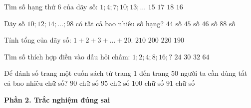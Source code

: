 \begin{ex} %
Tìm số hạng thứ 6 của dãy số: $1; 4; 7; 10; 13; \dots$
\choice
{$15$}
{$17$}
{$18$}
{\True $16$}
\end{ex}

\begin{ex} %
Dãy số $10; 12; 14; \dots; 98$ có tất cả bao nhiêu số hạng?
\choice
{$44$ số}
{\True $45$ số}
{$46$ số}
{$88$ số}
\end{ex}

\begin{ex} %
Tính tổng của dãy số: $1 + 2 + 3 + \dots + 20$.
\choice
{\True $210$}
{$200$}
{$220$}
{$190$}
\end{ex}

\begin{ex} %
Tìm số thích hợp điền vào dấu hỏi chấm: $1; 2; 4; 8; 16; ?$
\choice
{$24$}
{$30$}
{\True $32$}
{$64$}
\end{ex}

\begin{ex} %
Để đánh số trang một cuốn sách từ trang 1 đến trang 50 người ta cần dùng tất cả bao nhiêu chữ số?
\choice
{$90$ chữ số}
{$95$ chữ số}
{$100$ chữ số}
{\True $91$ chữ số}
\end{ex}

\textbf{Phần 2. Trắc nghiệm đúng sai}

